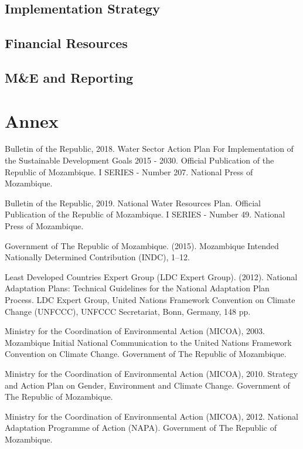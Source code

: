 \documentclass[
]{book}
\begin{document}
\hypertarget{implementation-strategy}{%
\section{Implementation Strategy}\label{implementation-strategy}}

\hypertarget{financial-resources}{%
\section{Financial Resources}\label{financial-resources}}

\hypertarget{me-and-reporting}{%
\section{M\&E and Reporting}\label{me-and-reporting}}

\hypertarget{annex}{%
\chapter{Annex}\label{annex}}

Bulletin of the Republic, 2018. Water Sector Action Plan For Implementation of the Sustainable Development Goals 2015 - 2030. Official Publication of the Republic of Mozambique. I SERIES - Number 207. National Press of Mozambique.

Bulletin of the Republic, 2019. National Water Resources Plan. Official Publication of the Republic of Mozambique. I SERIES - Number 49. National Press of Mozambique.

Government of The Republic of Mozambique. (2015). Mozambique Intended Nationally Determined Contribution (INDC), 1--12.

Least Developed Countries Expert Group (LDC Expert Group). (2012). National Adaptation Plans: Technical Guidelines for the National Adaptation Plan Process. LDC Expert Group, United Nations Framework Convention on Climate Change (UNFCCC), UNFCCC Secretariat, Bonn, Germany, 148 pp.~

Ministry for the Coordination of Environmental Action (MICOA), 2003. Mozambique Initial National Communication to the United Nations Framework Convention on Climate Change. Government of The Republic of Mozambique.

Ministry for the Coordination of Environmental Action (MICOA), 2010. Strategy and Action Plan on Gender, Environment and Climate Change. Government of The Republic of Mozambique.

Ministry for the Coordination of Environmental Action (MICOA), 2012. National Adaptation Programme of Action (NAPA). Government of The Republic of Mozambique.
\end{document}
